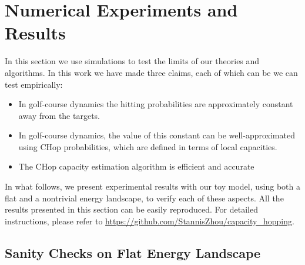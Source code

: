 \documentclass[english, aip, jcp, priprint, graphicx,floatfix]{revtex4-1}
\theoremstyle{plain}
\theoremstyle{definition}
\theoremstyle{plain}
\begin{document}
                                     

\section{Numerical Experiments and Results}\label{sec:experiments}

In this section we use simulations to test the limits of our theories and algorithms.  In this work we have made three claims, each of which can be we can test empirically:

\begin{itemize}
\item In golf-course dynamics the hitting probabilities are approximately constant away from the targets.
\item In golf-course dynamics, the value of this constant can be well-approximated using CHop probabilities, which are defined in terms of local capacities.
\item The CHop capacity estimation algorithm is efficient and accurate
\end{itemize}

In what follows, we present experimental results with our toy model, using both a flat and a nontrivial energy landscape, to verify each of these aspects.  All the results presented in this section can be easily reproduced. For detailed instructions, please refer to \url{https://github.com/StannisZhou/capacity_hopping}.

\subsection{Sanity Checks on Flat Energy Landscape}
\end{document}
